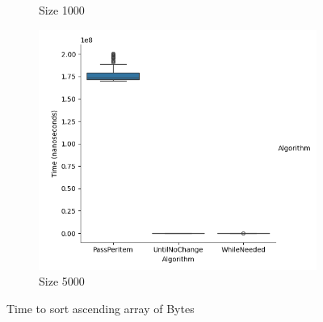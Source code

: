 \documentclass{article}
\begin{document}
\begin{figure}[ht]
\begin{subfigure}{0.3\textwidth}
    \caption{Size 1000}
    \label{fig:img2}
  \end{subfigure}
  \begin{subfigure}{0.3\textwidth}
    \centering
    \includegraphics[width=\linewidth]{../figureByteAsc5000.png}
    \caption{Size 5000}
    \label{fig:img3}
  \end{subfigure}
  \caption{Time to sort ascending array of Bytes}
  \label{fig:three_images}
\end{figure}
\end{document}
